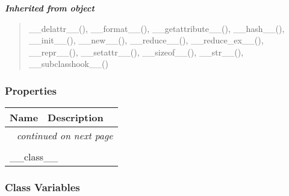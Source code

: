 \large{\textbf{\textit{Inherited from object}}}

\begin{quote}
\_\_delattr\_\_(), \_\_format\_\_(), \_\_getattribute\_\_(), \_\_hash\_\_(), \_\_init\_\_(), \_\_new\_\_(), \_\_reduce\_\_(), \_\_reduce\_ex\_\_(), \_\_repr\_\_(), \_\_setattr\_\_(), \_\_sizeof\_\_(), \_\_str\_\_(), \_\_subclasshook\_\_()
\end{quote}


  \subsubsection{Properties}

    \vspace{-1cm}
\hspace{\varindent}\begin{longtable}{|p{\varnamewidth}|p{\vardescrwidth}|l}
\cline{1-2}
\cline{1-2} \centering \textbf{Name} & \centering \textbf{Description}& \\
\cline{1-2}
\endhead\cline{1-2}\multicolumn{3}{r}{\small\textit{continued on next page}}\\\endfoot\cline{1-2}
\endlastfoot\multicolumn{2}{|l|}{\textit{Inherited from object}}\\
\multicolumn{2}{|p{\varwidth}|}{\raggedright \_\_class\_\_}\\
\cline{1-2}
\end{longtable}



  \subsubsection{Class Variables}

